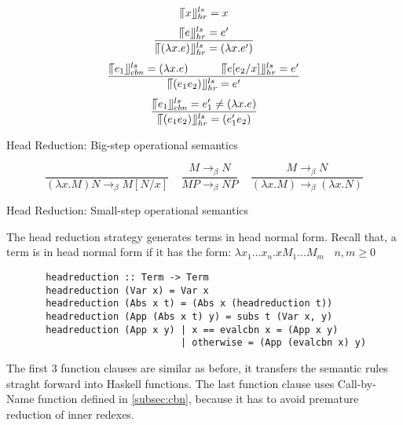 \begin{equation*}
\llceil x \rrfloor ^{ls} _{hr} = x
\end{equation*}
\begin{equation*}
\frac{\llceil e \rrfloor ^{ls} _{hr} = e'}{\llceil (\lambda x.e) \rrfloor ^{ls} _{hr} = (\lambda x.e')}
\end{equation*}
\begin{equation*}
\frac{\llceil e_1 \rrfloor ^{ls} _{cbn} = (\lambda x.e)\ \ \ \ \ \ \ \ \ \llceil e[e_2/x] \rrfloor ^{ls} _{hr} = e'}{\llceil (e_1e_2) \rrfloor ^{ls} _{hr} = e'}
\end{equation*}
\begin{equation*}
\frac{\llceil e_1 \rrfloor ^{ls} _{cbn} = e'_1\neq (\lambda x.e)}{\llceil (e_1e_2) \rrfloor ^{ls} _{hr}  = (e'_1e_2)}
\end{equation*}
\begin{center}
Head Reduction: Big-step operational semantics
\end{center}


\begin{equation*}
\frac{}{(\lambda x.M)N \rightarrow _\beta M[N/x]}\ \ \ \ \  
\frac{M \rightarrow _\beta N}{MP \rightarrow _\beta NP}\ \ \ \ \ 
\frac{M \rightarrow _\beta N}{(\lambda x.M) \rightarrow _\beta (\lambda x.N)}
\end{equation*}
\begin{center}
Head Reduction: Small-step operational semantics
\end{center}

The head reduction strategy generates terms in head normal form. Recall that, a term is in head normal form if it has the form: $\lambda x_1\ldots x_n.xM_1\ldots M_m\ \ \ \ n,m\geqslant 0$

\begin{verbatim}
       headreduction :: Term -> Term
       headreduction (Var x) = Var x
       headreduction (Abs x t) = (Abs x (headreduction t))
       headreduction (App (Abs x t) y) = subs t (Var x, y)
       headreduction (App x y) | x == evalcbn x = (App x y)
                               | otherwise = (App (evalcbn x) y)  
\end{verbatim}

The first 3 function clauses are similar as before, it transfers the semantic rules straght forward into Haskell functions. The last function clause uses Call-by-Name function defined in \ref{subsec:cbn}, because it has to avoid premature reduction of inner redexes. 


